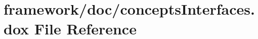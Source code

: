 \hypertarget{concepts_interfaces_8dox}{}\section{framework/doc/concepts\+Interfaces.dox File Reference}
\label{concepts_interfaces_8dox}
